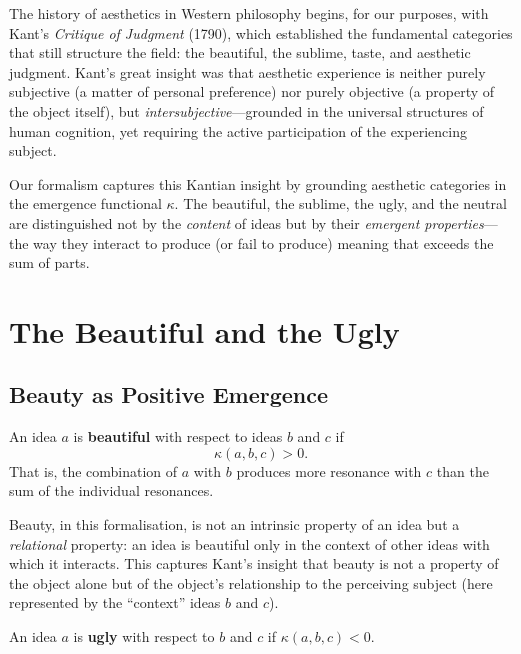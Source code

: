 The history of aesthetics in Western philosophy begins, for our purposes,
with Kant's \emph{Critique of Judgment} (1790), which established the
fundamental categories that still structure the field: the beautiful,
the sublime, taste, and aesthetic judgment.  Kant's great insight was
that aesthetic experience is neither purely subjective (a matter of
personal preference) nor purely objective (a property of the object
itself), but \emph{intersubjective}---grounded in the universal structures
of human cognition, yet requiring the active participation of the
experiencing subject.

Our formalism captures this Kantian insight by grounding aesthetic
categories in the emergence functional $\kappa$.  The beautiful, the
sublime, the ugly, and the neutral are distinguished not by the
\emph{content} of ideas but by their \emph{emergent properties}---the way
they interact to produce (or fail to produce) meaning that exceeds the
sum of parts.

\section{The Beautiful and the Ugly}
\label{sec:kant:beautiful}

\subsection{Beauty as Positive Emergence}

\begin{definition}
\label{def:beautiful}
An idea $a$ is \textbf{beautiful} with respect to ideas $b$ and $c$ if
\[
  \kappa(a, b, c) > 0.
\]
That is, the combination of $a$ with $b$ produces more resonance with $c$
than the sum of the individual resonances.
\end{definition}

Beauty, in this formalisation, is not an intrinsic property of an idea
but a \emph{relational} property: an idea is beautiful only in the context
of other ideas with which it interacts.  This captures Kant's insight that
beauty is not a property of the object alone but of the object's
relationship to the perceiving subject (here represented by the ``context''
ideas $b$ and $c$).

\begin{definition}
\label{def:ugly}
An idea $a$ is \textbf{ugly} with respect to $b$ and $c$ if
$\kappa(a, b, c) < 0$.
\end{definition}

